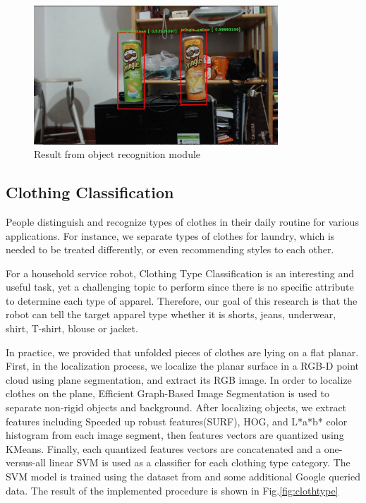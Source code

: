 \documentclass{llncs}
\begin{document}
\begin{figure}
\centering
\includegraphics[height=5.2cm]{object_hog}
\caption{Result from object recognition module}
\label{fig:objectHOG}
\end{figure}

\subsection{Clothing Classification}

People distinguish and recognize types of clothes in their daily routine for various applications. For instance, we separate types of clothes for laundry, which is needed to be treated differently, or even recommending styles to each other. 

For a household service robot, Clothing Type Classification is an interesting and useful task, yet a challenging topic to perform since there is no specific attribute to determine each type of apparel. Therefore, our goal of this research is that the robot can tell the target apparel type whether it is shorts, jeans, underwear, shirt, T-shirt, blouse or jacket.	 
 
In practice, we provided that unfolded pieces of clothes are lying on a flat planar. First, in the localization process, we localize the planar surface in a RGB-D point cloud using \cite{pcllib} plane segmentation, and extract its RGB image. In order to localize clothes on the plane, Efficient Graph-Based Image Segmentation \cite{egbis} is used to separate non-rigid objects and background. After localizing objects, we extract features including Speeded up robust features(SURF), HOG, and L*a*b* color histogram from each image segment, then features vectors are quantized using KMeans. Finally, each quantized features vectors are concatenated and a one-versus-all linear SVM is used as a classifier for each clothing type category. The SVM model is trained using the dataset from \cite{apparel_with_style} and some additional Google queried data. The result of the implemented procedure is shown in Fig.\ref{fig:clothtype}
\end{document}
